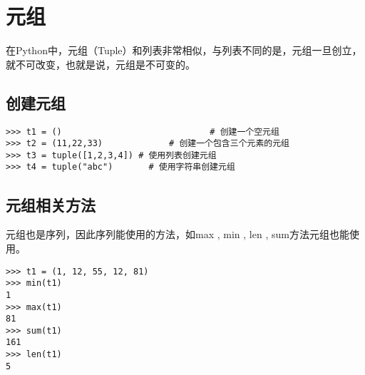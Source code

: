 \section{元组}

在Python中，元组（Tuple）和列表非常相似，与列表不同的是，元组一旦创立，就不可改变，也就是说，元组是不可变的。

\subsection{创建元组}

\begin{lstlisting}
>>> t1 = () 							# 创建一个空元组
>>> t2 = (11,22,33) 			# 创建一个包含三个元素的元组
>>> t3 = tuple([1,2,3,4]) # 使用列表创建元组
>>> t4 = tuple("abc") 		# 使用字符串创建元组
\end{lstlisting}

\subsection{元组相关方法}
元组也是序列，因此序列能使用的方法，如max , min , len , sum方法元组也能使用。

\begin{lstlisting}
>>> t1 = (1, 12, 55, 12, 81)
>>> min(t1)
1
>>> max(t1)
81
>>> sum(t1)
161
>>> len(t1)
5
\end{lstlisting}

